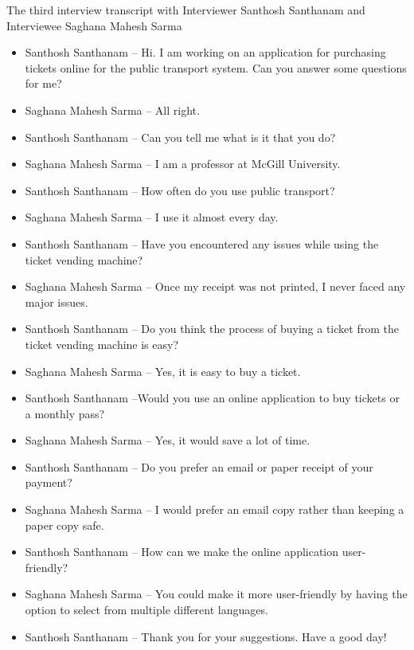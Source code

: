 The third interview transcript with Interviewer Santhosh Santhanam and Interviewee Saghana Mahesh Sarma

\begin{itemize}
    \item[] Santhosh Santhanam – Hi. I am working on an application for purchasing tickets online for the public transport system. Can you answer some questions for me?
    \item[] Saghana Mahesh Sarma – All right.
    \item[] Santhosh Santhanam – Can you tell me what is it that you do?
    \item[] Saghana Mahesh Sarma – I am a professor at McGill University. 
    \item[] Santhosh Santhanam – How often do you use public transport?
    \item[] Saghana Mahesh Sarma – I use it almost every day.
    \item[] Santhosh Santhanam – Have you encountered any issues while using the ticket vending machine?
    \item[] Saghana Mahesh Sarma – Once my receipt was not printed, I never faced any major issues.
    \item[] Santhosh Santhanam – Do you think the process of buying a ticket from the ticket vending machine is easy?
    \item[] Saghana Mahesh Sarma – Yes, it is easy to buy a ticket.
    \item[] Santhosh Santhanam –Would you use an online application to buy tickets or a monthly pass? 
    \item[] Saghana Mahesh Sarma – Yes, it would save a lot of time.
    \item[] Santhosh Santhanam – Do you prefer an email or paper receipt of your payment?
    \item[] Saghana Mahesh Sarma – I would prefer an email copy rather than keeping a paper copy safe.
    \item[] Santhosh Santhanam – How can we make the online application user-friendly?
    \item[] Saghana Mahesh Sarma – You could make it more user-friendly by having the option to select from multiple different languages.
    \item[] Santhosh Santhanam – Thank you for your suggestions. Have a good day!
\end{itemize}
\pagebreak
